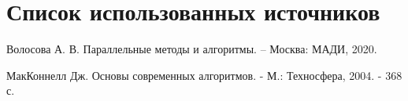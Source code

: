 \chapter*{Список использованных источников}

\begin{enumerate}[label = {[\arabic*]}]
	 Волосова А. В. Параллельные методы и алгоритмы. -- Москва: МАДИ, 2020.
	
	
	 МакКоннелл Дж. Основы современных алгоритмов. - М.: Техносфера, 2004. - 368 с.
\end{enumerate}
